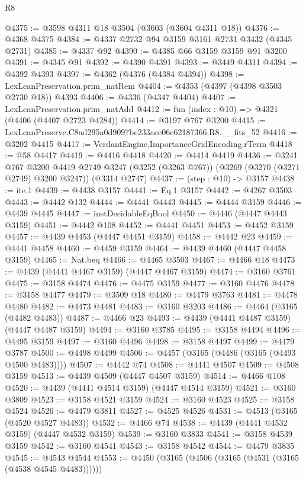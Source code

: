 \begin{lexlean}{R8}
\begin{coremodule}
@4375 := @3598 @4311 @18 @3504 (@3603 (@3604 @4311 @18))
@4376 := @4368 @4375
@4384 := @4337 @2732 @94 @3159 @3161 @2731 @3432 (@4345 @2731)
@4385 := @4337 @92
@4390 := @4385 @66 @3159 @3159 @91 @3200
@4391 := @4345 @91
@4392 := @4390 @4391
@4393 := @3449 @4311
@4394 := @4392 @4393
@4397 := @4362 (@4376 (@4384 @4394))
@4398 := LexLeanPreservation.prim_natRem
@4404 := @4353 (@4397 (@4398 @3503 @2730 @18)) @4393
@4406 := @4336 (@4347 @4404)
@4407 := LexLeanPreservation.prim_natAdd
@4412 := fun (index : @10) => @4321 (@4406 (@4407 @2723 @4284))
@4414 := @3197 @767 @3200
@4415 := LexLeanPreserve.C8ad295a0d9097be233aee06c62187366.R8.__fits_52
@4416 := @3202 @4415
@4417 := VerdantEngine.ImportanceGridEncoding.rTerm
@4418 := @58 @4417
@4419 := @4416 @4418
@4420 := @4414 @4419
@4436 := @3241
    @767
    @3200
    @4419
    @2749
    @3247
    (@3252 (@3263 @767))
    (@3269 (@3270 (@3271 @2749) @3200 @3247))
    (@3314 @2747)
@4437 := (step : @10) -> @3157
@4438 := ite.{1}
@4439 := @4438 @3157
@4441 := Eq.{1} @3157
@4442 := @4267 @3503
@4443 := @4442 @132
@4444 := @4441 @4443
@4445 := @4444 @3159
@4446 := @4439 @4445
@4447 := instDecidableEqBool
@4450 := @4446 (@4447 @4443 @3159)
@4451 := @4442 @108
@4452 := @4441 @4451
@4453 := @4452 @3159
@4457 := @4439 @4453 (@4447 @4451 @3159)
@4458 := @4442 @23
@4459 := @4441 @4458
@4460 := @4459 @3159
@4464 := @4439 @4460 (@4447 @4458 @3159)
@4465 := Nat.beq
@4466 := @4465 @3503
@4467 := @4466 @18
@4473 := @4439 (@4441 @4467 @3159) (@4447 @4467 @3159)
@4474 := @3160 @3761
@4475 := @3158 @4474
@4476 := @4475 @3159
@4477 := @3160 @4476
@4478 := @3158 @4477
@4479 := @3509 @18
@4480 := @4479 @3763
@4481 := @4478 @4480
@4482 := @4473 @4481
@4483 := @3160 @3203
@4486 := @4464 (@3165 (@4482 @4483))
@4487 := @4466 @23
@4493 := @4439 (@4441 @4487 @3159) (@4447 @4487 @3159)
@4494 := @3160 @3785
@4495 := @3158 @4494
@4496 := @4495 @3159
@4497 := @3160 @4496
@4498 := @3158 @4497
@4499 := @4479 @3787
@4500 := @4498 @4499
@4506 := @4457 (@3165 (@4486 (@3165 (@4493 @4500 @4483))))
@4507 := @4442 @74
@4508 := @4441 @4507
@4509 := @4508 @3159
@4513 := @4439 @4509 (@4447 @4507 @3159)
@4514 := @4466 @108
@4520 := @4439 (@4441 @4514 @3159) (@4447 @4514 @3159)
@4521 := @3160 @3809
@4523 := @3158 @4521 @3159
@4524 := @3160 @4523
@4525 := @3158 @4524
@4526 := @4479 @3811
@4527 := @4525 @4526
@4531 := @4513 (@3165 (@4520 @4527 @4483))
@4532 := @4466 @74
@4538 := @4439 (@4441 @4532 @3159) (@4447 @4532 @3159)
@4539 := @3160 @3833
@4541 := @3158 @4539 @3159
@4542 := @3160 @4541
@4543 := @3158 @4542
@4544 := @4479 @3835
@4545 := @4543 @4544
@4553 := @4450 (@3165 (@4506 (@3165 (@4531 (@3165 (@4538 @4545 @4483))))))

\end{coremodule}
\end{lexlean}
